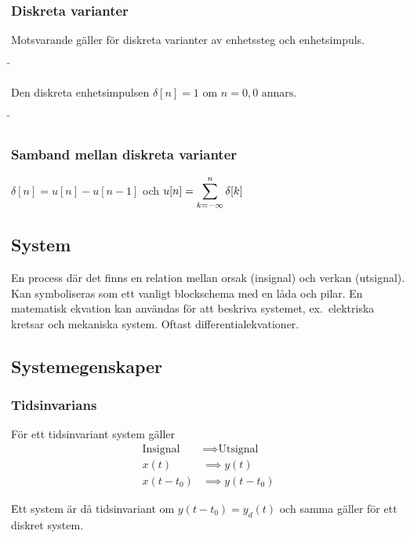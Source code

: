 \documentclass[a4paper]{article}
\begin{document}
\subsubsection{Diskreta varianter}
Motsvarande gäller för diskreta varianter av enhetssteg och enhetsimpuls.

\f

\begin{defn}
    Den diskreta enhetsimpulsen \(
        \delta [n] = 1 \text{ om } n = 0, 0 \text{ annars.} 
    \) 
\end{defn}

\f

\subsubsection{Samband mellan diskreta varianter}
\(
    \delta [n] = u[n] - u[n-1]
\) och \(
    u[n] = \displaystyle\sum_{k=-\infty}^{n} \delta[k]
\) 

\subsection{System}
En process där det finns en relation mellan orsak (insignal) och verkan 
(utsignal). Kan symboliseras som ett vanligt blockschema med en låda
och pilar. En matematisk ekvation kan användas för att beskriva systemet, 
ex.\ elektriska kretsar och mekaniska system. Oftast differentialekvationer.

\subsection{Systemegenskaper}
\subsubsection{Tidsinvarians}
För ett tidsinvariant system gäller 
\begin{align*}
    \text{Insignal} &\implies \text{Utsignal} \\
    x(t) &\implies y(t) \\
    x(t-t_0) &\implies y(t-t_0)
\end{align*}


\f 

Ett system är då tidsinvariant om \(
    y(t-t_0) = y_d(t)
\) och samma gäller för ett diskret system. 
\end{document}
